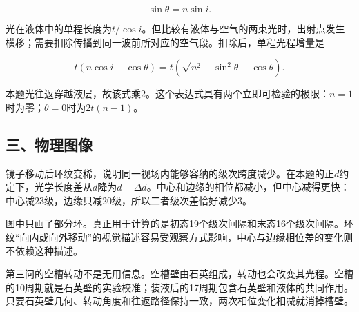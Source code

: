 \documentclass[12pt,a4paper,fontset=fandol]{ctexart}
\begin{document}
\[
\sin\theta=n\sin i.
\]

光在液体中的单程长度为\(t/\cos i\)。但比较有液体与空气的两束光时，出射点发生横移；需要扣除传播到同一波前所对应的空气段。扣除后，单程光程增量是

\[
t(n\cos i-\cos\theta)
=t\left(\sqrt{n^2-\sin^2\theta}-\cos\theta\right).
\]

本题光往返穿越液层，故该式乘2。这个表达式具有两个立即可检验的极限：\(n=1\)时为零；\(\theta=0\)时为\(2t(n-1)\)。

\subsection{三、物理图像}\label{ux4e09ux7269ux7406ux56feux50cf}

镜子移动后环纹变稀，说明同一视场内能够容纳的级次跨度减少。在本题的正\(d\)约定下，光学长度差从\(d\)降为\(d-\Delta d\)。中心和边缘的相位都减小，但中心减得更快：中心减23级，边缘只减20级，所以二者级次差恰好减少3。

\begin{center}
\begin{minipage}{\linewidth}
\centering\begingroup{}
\ifdim\wd\diagrambox>.88\linewidth
\sbox{\diagrambox}{\resizebox{.88\linewidth}{!}{\usebox{\diagrambox}}}\fi
\ifdim\ht\diagrambox>.38\textheight
\resizebox{!}{.38\textheight}{\usebox{\diagrambox}}
\else\usebox{\diagrambox}\fi
\par{}\endgroup\end{minipage}\end{center}

图中只画了部分环。真正用于计算的是初态19个级次间隔和末态16个级次间隔。环纹``向内或向外移动''的视觉描述容易受观察方式影响，中心与边缘相位差的变化则不依赖这种描述。

第三问的空槽转动不是无用信息。空槽壁由石英组成，转动也会改变其光程。空槽的10周期就是石英壁的实验校准；装液后的17周期包含石英壁和液体的共同作用。只要石英壁几何、转动角度和往返路径保持一致，两次相位变化相减就消掉槽壁。
\end{document}
